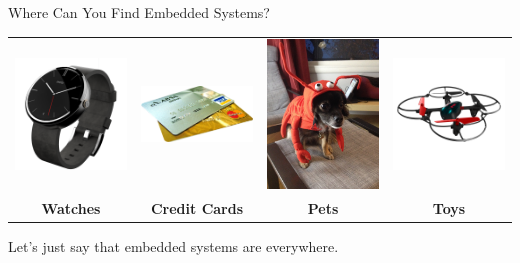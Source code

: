\documentclass[aspectratio=169]{beamer}
\begin{document}
	
	\begin{frame}{Where Can You Find Embedded Systems?}
	\centering
		\begin{tabular}{c c c c}		
			\includegraphics[width=8em]{img/Motorola_Moto_360_Minimal_Watch_Face.png} &
			\includegraphics[width=8em]{img/creditcards.png} &
			\includegraphics[width=8em]{img/IMG_0198} &
			\includegraphics[width=8em]{img/electro_max_eye_720p_video_drone_angle_left} \\
			\tiny{\textbf{Watches}} &
			\tiny{\textbf{Credit Cards}} &
			\tiny{\textbf{Pets}} &
			\tiny{\textbf{Toys}}
		\end{tabular}
		\newline		
		
		Let's just say that embedded systems are everywhere.
	\end{frame}
\end{document}
